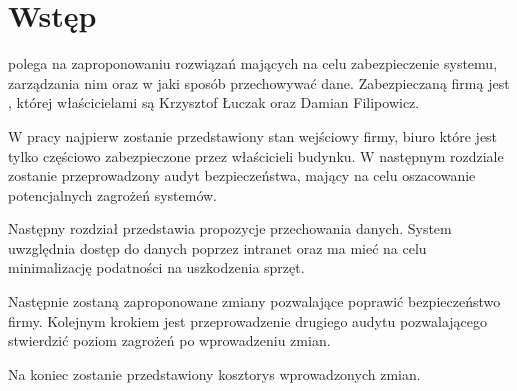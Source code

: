 \newpage\section*{Wstęp}
\TytulPolski \space polega na zaproponowaniu rozwiązań mających na celu zabezpieczenie systemu, zarządzania nim oraz w jaki sposób przechowywać dane. Zabezpieczaną firmą jest \NazwaFirmy, której właścicielami są Krzysztof Łuczak oraz Damian Filipowicz. 

W pracy najpierw zostanie przedstawiony stan wejściowy firmy, biuro które jest tylko częściowo zabezpieczone przez właścicieli budynku. \linebreak W następnym rozdziale zostanie przeprowadzony audyt bezpieczeństwa, \linebreak mający na celu oszacowanie potencjalnych zagrożeń systemów.

 Następny rozdział przedstawia propozycje przechowania danych. System uwzględnia dostęp do danych poprzez intranet oraz ma mieć na celu minimalizację podatności na uszkodzenia sprzęt.
 
Następnie zostaną zaproponowane zmiany pozwalające poprawić bezpieczeństwo firmy. Kolejnym krokiem jest przeprowadzenie drugiego audytu pozwalającego stwierdzić poziom zagrożeń po wprowadzeniu zmian.

Na koniec zostanie przedstawiony kosztorys wprowadzonych zmian. 